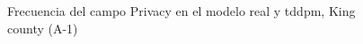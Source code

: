 \begin{figure}[H]
    \centering
    
    \caption{Frecuencia del campo Privacy en el modelo real y tddpm, King county (A-1)}
    \label{frecuency-tddpm-privacy}
\end{figure}